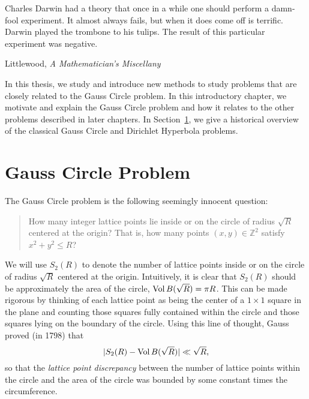 

\hfill
\begin{minipage}{4in}
  \small
  \singlespacing{}
  Charles Darwin had a theory that once in a while one should perform a damn-fool
  experiment.
  It almost always fails, but when it does come off is terrific.\\

  Darwin played the trombone to his tulips.
  The result of this particular experiment was negative.
  \vspace{.3ex}
  \begin{flushright}
    {Littlewood, \textit{A Mathematician's Miscellany}}
  \end{flushright}
\end{minipage}





In this thesis, we study and introduce new methods to study problems that are closely
related to the Gauss Circle problem.
In this introductory chapter, we motivate and explain the Gauss Circle problem and how it
relates to the other problems described in later chapters.
In Section~\ref{sec:intro:GaussCircleExplanation}, we give a historical overview of the
classical Gauss Circle and Dirichlet Hyperbola problems.




\section{Gauss Circle Problem}\label{sec:intro:GaussCircleExplanation}




The Gauss Circle problem is the following seemingly innocent question:
\begin{quote}
  How many integer lattice points lie inside or on the circle of radius $\sqrt R$ centered
  at the origin? That is, how many points $(x,y) \in \mathbb{Z}^2$ satisfy $x^2 + y^2 \leq
  R$?
\end{quote}
We will use $S_2(R)$ to denote the number of lattice points inside or on the circle of
radius $\sqrt R$ centered at the origin.
Intuitively, it is clear that $S_2(R)$ should be approximately the area of the circle,
$\operatorname*{Vol} B(\sqrt R) = \pi R$.
This can be made rigorous by thinking of each lattice point as being the center of a $1
\times 1$ square in the plane and counting those squares fully contained within the circle
and those squares lying on the boundary of the circle.
Using this line of thought, Gauss proved (in 1798) that
\begin{equation}
  \lvert S_2(R) - \operatorname*{Vol} B(\sqrt R) \rvert \ll \sqrt R,
\end{equation}
so that the \emph{lattice point discrepancy} between the
number of lattice points within the circle and the area of the circle was bounded by some
constant times the circumference.


